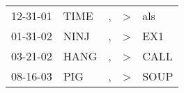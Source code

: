 \begin{supertabular}{lllll}
 12-31-01 &  TIME &  , &  \textgreater &   als \\
 01-31-02 &  NINJ &  , &  \textgreater &   EX1 \\
 03-21-02 &  HANG &  , &  \textgreater &  CALL \\
 08-16-03 &   PIG &  , &  \textgreater &  SOUP \\
\end{supertabular}
